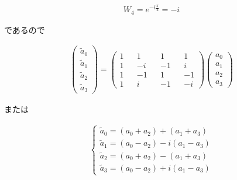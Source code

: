 \begin{align*}
    W_4 = e^{-i\frac{\pi}{2}} = -i
\end{align*}

であるので

\begin{align}
    \begin{pmatrix}
        \tilde{a}_0 \\
        \tilde{a}_1 \\
        \tilde{a}_2 \\
        \tilde{a}_3
    \end{pmatrix}
    =
    \begin{pmatrix}
        1 && 1 && 1 && 1 \\
        1 && -i && -1 && i \\
        1 && -1 && 1 && -1 \\
        1 && i && -1 && -i 
    \end{pmatrix}
    \begin{pmatrix}
        a_0 \\
        a_1 \\
        a_2 \\
        a_3
    \end{pmatrix}
\end{align}

または

\begin{align}
    \begin{cases}
        \tilde{a}_0 = (a_0 + a_2) + (a_1 + a_3) \\
        \tilde{a}_1 = (a_0 - a_2) - i(a_1 - a_3) \\
        \tilde{a}_2 = (a_0 + a_2) - (a_1 + a_3)\\   
        \tilde{a}_3 = (a_0 - a_2) + i(a_1 - a_3)
    \end{cases}
\end{align}
